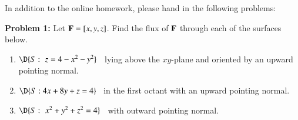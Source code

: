 \documentclass[11pt]{article}
\begin{document}


In addition to the online homework, please hand in the following problems:

\vspace{0.2cm}

{\bf Problem 1:} Let ${\bf F} = [x,y,z]$. Find the flux of ${\bf F}$ through each of the surfaces below.

\begin{enumerate}
	\item[a.] $\D{S: \,\,z = 4 - x^2 - y^2}$ \, lying above the $xy$-plane and oriented by an upward pointing normal.
	
	\vspace{0.2cm}
	
	\item[b.] $\D{S: 4x + 8y + z = 4}$ \, in the first octant with an upward pointing normal.
	
	\vspace{0.2cm}
	
	\item[c.] $\D{S: \,\,x^2 + y^2 + z^2 = 4}$ \, with outward pointing normal.
\end{enumerate}

		
\end{document}
